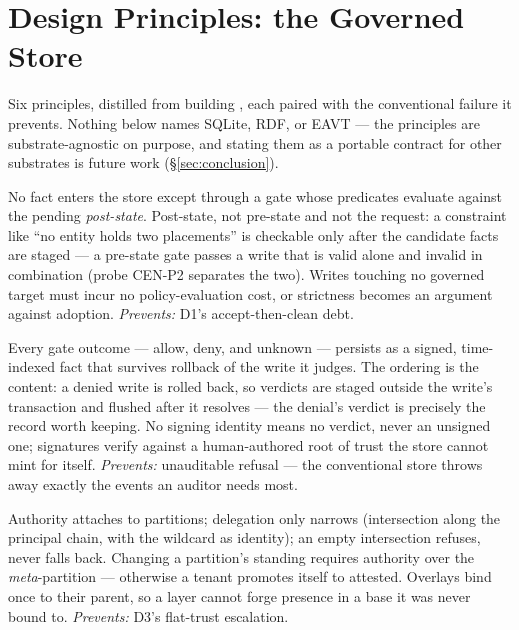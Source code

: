 \section{Design Principles: the Governed Store}
\label{sec:principles}

Six principles, distilled from building \sys, each paired with the
conventional failure it prevents. Nothing below names SQLite, RDF, or
EAVT --- the principles are substrate-agnostic on purpose, and stating
them as a portable contract for other substrates is future work
(\S\ref{sec:conclusion}).

\begin{description}[leftmargin=1.4em,itemsep=0.35em]
\item[GS1 --- Gated writes.] No fact enters the store except through a
  gate whose predicates evaluate against the pending
  \emph{post-state}. Post-state, not pre-state and not the request: a
  constraint like ``no entity holds two placements'' is checkable only
  after the candidate facts are staged --- a pre-state gate passes a
  write that is valid alone and invalid in combination
  (\census probe CEN-P2 separates the two). Writes touching no
  governed target must incur no policy-evaluation cost, or strictness
  becomes an argument against adoption. \emph{Prevents:} D1's
  accept-then-clean debt.
\item[GS2 --- Verdict permanence.] Every gate outcome --- allow, deny,
  and unknown --- persists as a signed, time-indexed fact that survives
  rollback of the write it judges. The ordering is the content: a
  denied write is rolled back, so verdicts are staged outside the
  write's transaction and flushed after it resolves --- the denial's
  verdict is precisely the record worth keeping. No signing identity
  means no verdict, never an unsigned one; signatures verify against a
  human-authored root of trust the store cannot mint for itself.
  \emph{Prevents:} unauditable refusal --- the conventional store throws
  away exactly the events an auditor needs most.
\item[GS3 --- Partitioned authority.] Authority attaches to partitions;
  delegation only narrows (intersection along the principal chain,
  with the wildcard as identity); an empty intersection refuses,
  never falls back. Changing a partition's standing requires authority
  over the \emph{meta}-partition --- otherwise a tenant promotes itself
  to attested. Overlays bind once to their parent, so a layer cannot
  forge presence in a base it was never bound to. \emph{Prevents:}
  D3's flat-trust escalation.

\end{description}
